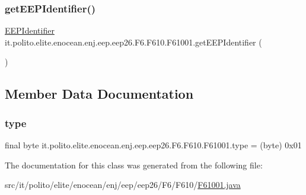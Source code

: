 \subsubsection{\texorpdfstring{get\+E\+E\+P\+Identifier()}{getEEPIdentifier()}}
{\footnotesize\ttfamily \hyperlink{classit_1_1polito_1_1elite_1_1enocean_1_1enj_1_1eep_1_1_e_e_p_identifier}{E\+E\+P\+Identifier} it.\+polito.\+elite.\+enocean.\+enj.\+eep.\+eep26.\+F6.\+F610.\+F61001.\+get\+E\+E\+P\+Identifier (\begin{DoxyParamCaption}{ }\end{DoxyParamCaption})}



\subsection{Member Data Documentation}
\hypertarget{classit_1_1polito_1_1elite_1_1enocean_1_1enj_1_1eep_1_1eep26_1_1_f6_1_1_f610_1_1_f61001_a686751620d1344ac1d01eedaf914887c}{}\label{classit_1_1polito_1_1elite_1_1enocean_1_1enj_1_1eep_1_1eep26_1_1_f6_1_1_f610_1_1_f61001_a686751620d1344ac1d01eedaf914887c} 
\subsubsection{\texorpdfstring{type}{type}}
{\footnotesize\ttfamily final byte it.\+polito.\+elite.\+enocean.\+enj.\+eep.\+eep26.\+F6.\+F610.\+F61001.\+type = (byte) 0x01\hspace{0.3cm}{\ttfamily [static]}}



The documentation for this class was generated from the following file\+:\begin{DoxyCompactItemize}
\item 
src/it/polito/elite/enocean/enj/eep/eep26/\+F6/\+F610/\hyperlink{_f61001_8java}{F61001.\+java}\end{DoxyCompactItemize}
